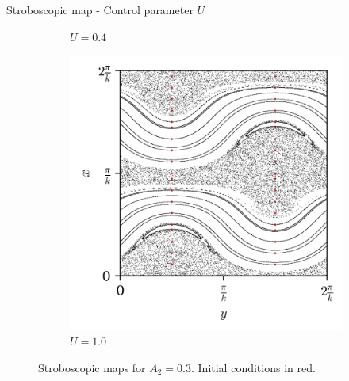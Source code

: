 \documentclass[10pt]{beamer}
\begin{document}
\begin{frame}{Stroboscopic map - Control parameter $U$}
\begin{figure}[h]
\begin{subfigure}[b]{0.3\textwidth}
        \caption{$U = 0.4$}
    \end{subfigure}
    \begin{subfigure}[b]{0.3\textwidth}
        \includegraphics[width=\textwidth]{graf_2ondas/map2_data-map_U_p1.0000.png}
        \caption{$U = 1.0$}
    \end{subfigure}
\caption{Stroboscopic maps for  $A_2 = 0.3$. Initial conditions in red.}
\label{mapa2}
\end{figure}

\end{frame}
\end{document}
